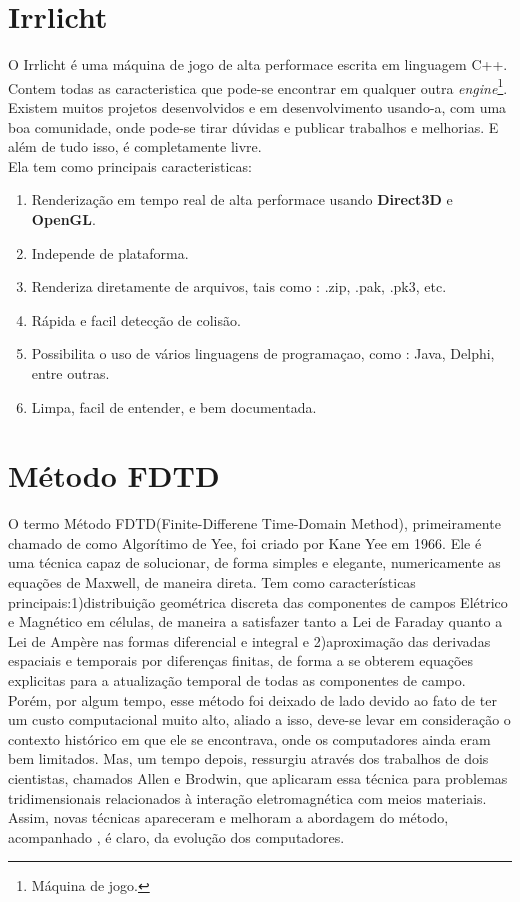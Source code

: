 \section{Irrlicht}
O Irrlicht é uma máquina de jogo de alta performace escrita em linguagem C++\cite{irrlichtbook}. Contem todas as caracteristica que pode-se encontrar em qualquer outra \textit{engine}\footnote{Máquina de jogo.}. Existem muitos projetos desenvolvidos e em desenvolvimento usando-a, com uma boa comunidade, onde pode-se tirar dúvidas e publicar trabalhos e melhorias. E além de tudo isso, é completamente livre\cite{irrlicht}.\\

Ela tem como principais caracteristicas:
\begin{enumerate}
\item Renderização em tempo real de alta performace usando \textbf{Direct3D} e \textbf{OpenGL}.
\item Independe de plataforma.
\item Renderiza diretamente de arquivos, tais como : .zip, .pak, .pk3, etc.
\item Rápida e facil detecção de colisão.
\item Possibilita o uso de vários linguagens de programaçao, como : Java, Delphi, entre outras.
\item Limpa, facil de entender, e bem documentada.
\end{enumerate}

\section{Método FDTD}
O termo Método FDTD(Finite-Differene Time-Domain Method), primeiramente chamado de como Algorítimo de Yee, foi criado por Kane Yee em 1966\cite{yeebook}. Ele é uma técnica capaz de solucionar, de forma simples e elegante, numericamente as equações de Maxwell, de maneira direta. Tem como características principais:1)distribuição geométrica discreta das componentes de campos Elétrico e Magnético em células, de maneira a satisfazer tanto a Lei de Faraday quanto a Lei de Ampère nas formas diferencial e integral e 2)aproximação das derivadas espaciais e temporais por diferenças finitas, de forma a se obterem equações explicitas para a atualização temporal de todas as componentes de campo\cite{rodrigo}.\\

Porém, por algum tempo, esse método foi deixado de lado devido ao fato de ter um custo computacional muito alto, aliado a isso, deve-se levar em consideração o contexto histórico em que ele se encontrava, onde os computadores ainda eram bem limitados. Mas, um tempo depois, ressurgiu através dos trabalhos de dois cientistas, chamados Allen e Brodwin, que aplicaram essa técnica para problemas tridimensionais relacionados à interação eletromagnética com meios materiais\cite{allen}. Assim, novas técnicas apareceram e melhoram a abordagem do método, acompanhado , é claro, da evolução dos computadores.\\

